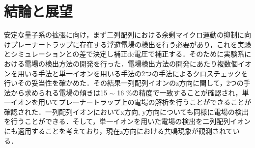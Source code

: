 \chapter{結論と展望}
安定な量子系の拡張に向け，まず二列配列における余剰マイクロ運動の抑制に向けプレーナートラップに存在する浮遊電場の検出を行う必要があり，これを実験とシミュレーションとの差で決定し補正dc電圧で補正する．そのために実験系における電場の検出方法の開発を行った．電場検出方法の開発にあたり複数個イオンを用いる手法と単一イオンを用いる手法の2つの手法によるクロスチェックを行いその妥当性を確かめた．その結果一列配列イオンのz方向に関して，2つの手法から求められる電場の傾きは15 $\sim$ 16 \%の精度で一致することが確認され，単一イオンを用いてプレーナートラップ上の電場の解析を行うことができることが確認された．一列配列イオンにおいてx方向, y方向についても同様に電場の検出を行うことができる．そして，単一イオンを用いた電場の検出を二列配列イオンにも適用することを考えており，現在z方向における共鳴現象が観測されている．